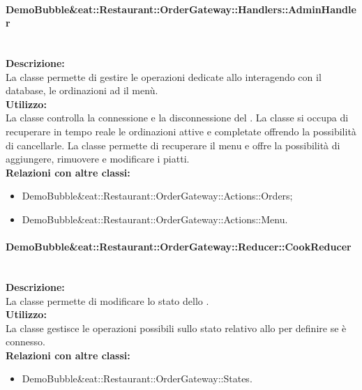 \paragraph{Demo\-Bubble\&eat\-::Restaurant\-::Order\-Gateway\-::Handlers\-::Admin\-Handler}\label{eat-handler}\mbox{}\\
\textbf{Descrizione:}\\
La classe permette di gestire le operazioni dedicate allo \Manager{} interagendo con il database, le ordinazioni ad il menù.\\
\textbf{Utilizzo:}\\
La classe controlla la connessione e la disconnessione del \Manager{}. La classe si occupa di recuperare in tempo reale le ordinazioni attive e completate offrendo la possibilità di cancellarle. La classe permette di recuperare il menu e offre la possibilità di aggiungere, rimuovere e modificare i piatti.\\
\textbf{Relazioni con altre classi:}\\
\begin{itemize}
	\item {Demo\-Bubble\&eat\-::Restaurant\-::Order\-Gateway\-::Actions\-::Orders};
	\item {Demo\-Bubble\&eat\-::Restaurant\-::Order\-Gateway\-::Actions\-::Menu}.
\end{itemize}

\paragraph{Demo\-Bubble\&eat\-::Restaurant\-::Order\-Gateway\-::Reducer\-::Cook\-Reducer}\label{eat-reducer}\mbox{}\\
\textbf{Descrizione:}\\
La classe permette di modificare lo stato dello \Chef{}.\\
\textbf{Utilizzo:}\\
La classe gestisce le operazioni possibili sullo stato relativo allo \Chef{} per definire se è connesso.\\
\textbf{Relazioni con altre classi:}\\
\begin{itemize}
	\item {Demo\-Bubble\&eat\-::Restaurant\-::Order\-Gateway\-::States}.
\end{itemize}

